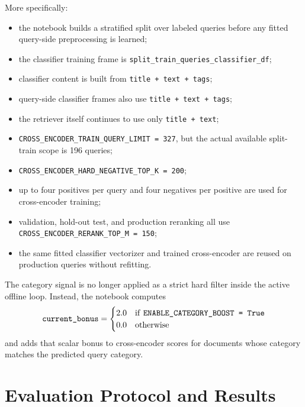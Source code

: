 \documentclass[11pt,a4paper]{article}
\begin{document}
More specifically:
\begin{itemize}
    \item the notebook builds a stratified split over labeled queries before any fitted query-side preprocessing is learned;
    \item the classifier training frame is \texttt{split\_train\_queries\_classifier\_df};
    \item classifier content is built from \texttt{title + text + tags};
    \item query-side classifier frames also use \texttt{title + text + tags};
    \item the retriever itself continues to use only \texttt{title + text};
    \item \texttt{CROSS\_ENCODER\_TRAIN\_QUERY\_LIMIT = 327}, but the actual available split-train scope is 196 queries;
    \item \texttt{CROSS\_ENCODER\_HARD\_NEGATIVE\_TOP\_K = 200};
    \item up to four positives per query and four negatives per positive are used for cross-encoder training;
    \item validation, hold-out test, and production reranking all use \texttt{CROSS\_ENCODER\_RERANK\_TOP\_M = 150};
    \item the same fitted classifier vectorizer and trained cross-encoder are reused on production queries without refitting.
\end{itemize}

The category signal is no longer applied as a strict hard filter inside the active offline loop. Instead, the notebook computes
\[
\texttt{current\_bonus} =
\begin{cases}
2.0 & \text{if \texttt{ENABLE\_CATEGORY\_BOOST = True}}\\
0.0 & \text{otherwise}
\end{cases}
\]
and adds that scalar bonus to cross-encoder scores for documents whose category matches the predicted query category.

\section{Evaluation Protocol and Results}
\end{document}

